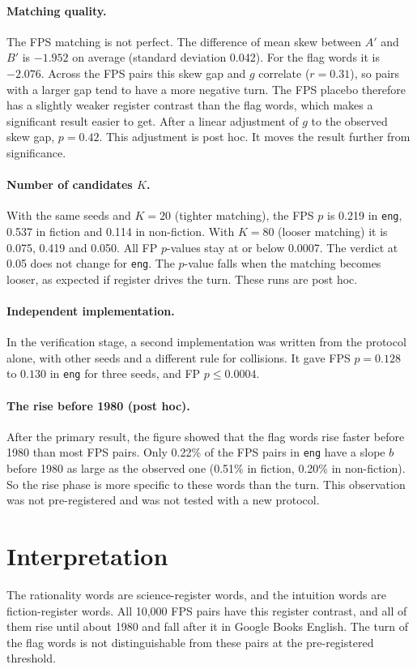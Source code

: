 \documentclass[11pt]{article}
\begin{document}
\paragraph{Matching quality.} The FPS matching is not perfect. The difference of mean skew between $A'$ and $B'$ is $-1.952$ on average (standard deviation 0.042). For the flag words it is $-2.076$. Across the FPS pairs this skew gap and $g$ correlate ($r = 0.31$), so pairs with a larger gap tend to have a more negative turn. The FPS placebo therefore has a slightly weaker register contrast than the flag words, which makes a significant result easier to get. After a linear adjustment of $g$ to the observed skew gap, $p = 0.42$. This adjustment is post hoc. It moves the result further from significance.

\paragraph{Number of candidates $K$.} With the same seeds and $K = 20$ (tighter matching), the FPS $p$ is 0.219 in \texttt{eng}, 0.537 in fiction and 0.114 in non-fiction. With $K = 80$ (looser matching) it is 0.075, 0.419 and 0.050. All FP $p$-values stay at or below 0.0007. The verdict at 0.05 does not change for \texttt{eng}. The $p$-value falls when the matching becomes looser, as expected if register drives the turn. These runs are post hoc.

\paragraph{Independent implementation.} In the verification stage, a second implementation was written from the protocol alone, with other seeds and a different rule for collisions. It gave FPS $p = 0.128$ to $0.130$ in \texttt{eng} for three seeds, and FP $p \le 0.0004$.

\paragraph{The rise before 1980 (post hoc).} After the primary result, the figure showed that the flag words rise faster before 1980 than most FPS pairs. Only 0.22\% of the FPS pairs in \texttt{eng} have a slope $b$ before 1980 as large as the observed one (0.51\% in fiction, 0.20\% in non-fiction). So the rise phase is more specific to these words than the turn. This observation was not pre-registered and was not tested with a new protocol.

\section{Interpretation}
The rationality words are science-register words, and the intuition words are fiction-register words. All 10,000 FPS pairs have this register contrast, and all of them rise until about 1980 and fall after it in Google Books English. The turn of the flag words is not distinguishable from these pairs at the pre-registered threshold.
\end{document}
